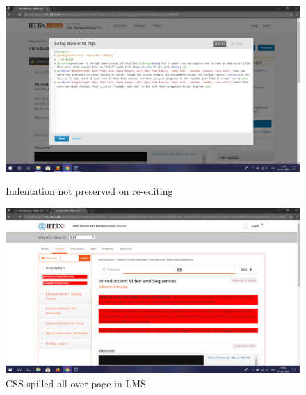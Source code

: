 \begin{figure}[ht]
  \centering
  \includegraphics[width=\textwidth]{images/issue_2}
  \caption{Indentation not preserved on re-editing}

  \vspace*{\floatsep}

  \includegraphics[width=\textwidth]{images/issue_3}
  \caption{CSS spilled all over page in LMS}
\end{figure}

